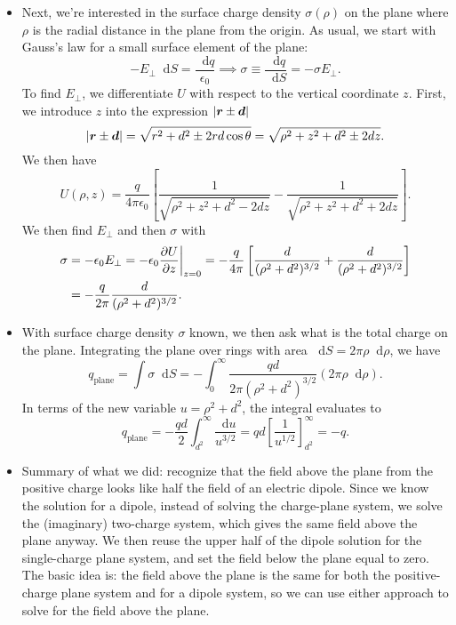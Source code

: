 \documentclass[11pt, a4paper]{article}
\newcommand{\diff}{\mathop{}\!\mathrm{d}} %
\renewcommand{\vec}[1]{\bm{#1}} %
\renewcommand{\r}{\vec{r}}
\newcommand{\ee}{\epsilon_{0}}  %
\begin{document}
\begin{itemize}
	\item Next, we're interested in the surface charge density $ \sigma(\rho) $ on the plane where $ \rho $ is the radial distance in the plane from the origin. As usual, we start with Gauss's law for a small surface element of the plane: 
	\begin{equation*}
		-E_{\perp}\diff S = \frac{\diff q}{\ee} \implies \sigma \equiv \frac{\diff q}{\diff S} =  -\sigma E_{\perp}.
	\end{equation*}
	To find $ E_{\perp} $, we differentiate $ U $ with respect to the vertical coordinate $ z $. First, we introduce $ z $ into the expression $ \abs{\r \pm \vec{d}} $
	\begin{equation*}
		\abs{\r \pm \vec{d}} = \sqrt{r^{2}+d^{2} \pm 2rd\cos \theta} = \sqrt{\rho^{2} + z^{2} + d^{2} \pm 2dz}.
	\end{equation*}
	We then have
	\begin{equation*}
		U(\rho, z) = \frac{q}{4\pi \ee}\left[\frac{1}{\sqrt{\rho^{2} + z^{2} + d^{2} - 2dz}} - \frac{1}{\sqrt{\rho^{2} + z^{2} + d^{2} + 2dz}}\right].
	\end{equation*}
	We then find $ E_{\perp} $ and then $ \sigma $ with
	\begin{align*}
		\sigma &= - \ee E_{\perp} = -\ee \pdv{U}{z}\bigg|_{z=0} = -\frac{q}{4\pi}\left[\frac{d}{(\rho^{2}+d^{2})^{3/2}} +  \frac{d}{(\rho^{2}+d^{2})^{3/2}} \right]\\
		& = -\frac{q}{2\pi} \frac{d}{(\rho^{2}+d^{2})^{3/2}}.
	\end{align*}
	
	\item With surface charge density $ \sigma $ known, we then ask what is the total charge on the plane. Integrating the plane over rings with area $ \diff S = 2\pi \rho \diff \rho $, we have
	\begin{equation*}
		q_{\text{plane}} = \int \sigma \diff S = - \int_{0}^{\infty} \frac{qd}{2\pi(\rho^{2}+d^{2})^{3/2}} (2\pi \rho \diff \rho).
	\end{equation*}
	In terms of the new variable $ u = \rho^{2} + d^{2} $, the integral evaluates to
	\begin{equation*}
		q_{\text{plane}} = -\frac{qd}{2}\int_{d^{2}}^{\infty}\frac{\diff u}{u^{3/2}} = qd \left[\frac{1}{u^{1/2}}\right]_{d^{2}}^{\infty} = -q.
	\end{equation*}
	
	\item Summary of what we did: recognize that the field above the plane from the positive charge looks like half the field of an electric dipole. Since we know the solution for a dipole, instead of solving the charge-plane system, we solve the (imaginary) two-charge system, which gives the same field above the plane anyway. We then reuse the upper half of the dipole solution for the single-charge plane system, and set the field below the plane equal to zero. The basic idea is: the field above the plane is the same for both the positive-charge plane system and for a dipole system, so we can use either approach to solve for the field above the plane. 
	

\end{itemize}
\end{document}
